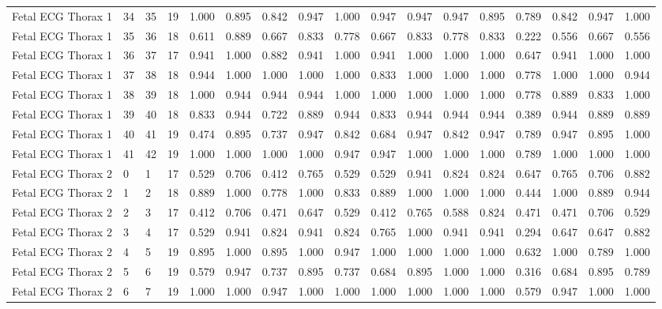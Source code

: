 \begin{longtable}{lllllllllllllllll}
Fetal ECG Thorax 1 & 34 & 35 & 19 & 1.000 & 0.895 & 0.842 & 0.947 & 1.000 & 0.947 & 0.947 & 0.947 & 0.895 & 0.789 & 0.842 & 0.947 & 1.000 \\
Fetal ECG Thorax 1 & 35 & 36 & 18 & 0.611 & 0.889 & 0.667 & 0.833 & 0.778 & 0.667 & 0.833 & 0.778 & 0.833 & 0.222 & 0.556 & 0.667 & 0.556 \\
Fetal ECG Thorax 1 & 36 & 37 & 17 & 0.941 & 1.000 & 0.882 & 0.941 & 1.000 & 0.941 & 1.000 & 1.000 & 1.000 & 0.647 & 0.941 & 1.000 & 1.000 \\
Fetal ECG Thorax 1 & 37 & 38 & 18 & 0.944 & 1.000 & 1.000 & 1.000 & 1.000 & 0.833 & 1.000 & 1.000 & 1.000 & 0.778 & 1.000 & 1.000 & 0.944 \\
Fetal ECG Thorax 1 & 38 & 39 & 18 & 1.000 & 0.944 & 0.944 & 0.944 & 1.000 & 1.000 & 1.000 & 1.000 & 1.000 & 0.778 & 0.889 & 0.833 & 1.000 \\
Fetal ECG Thorax 1 & 39 & 40 & 18 & 0.833 & 0.944 & 0.722 & 0.889 & 0.944 & 0.833 & 0.944 & 0.944 & 0.944 & 0.389 & 0.944 & 0.889 & 0.889 \\
Fetal ECG Thorax 1 & 40 & 41 & 19 & 0.474 & 0.895 & 0.737 & 0.947 & 0.842 & 0.684 & 0.947 & 0.842 & 0.947 & 0.789 & 0.947 & 0.895 & 1.000 \\
Fetal ECG Thorax 1 & 41 & 42 & 19 & 1.000 & 1.000 & 1.000 & 1.000 & 0.947 & 0.947 & 1.000 & 1.000 & 1.000 & 0.789 & 1.000 & 1.000 & 1.000 \\
Fetal ECG Thorax 2 & 0 & 1 & 17 & 0.529 & 0.706 & 0.412 & 0.765 & 0.529 & 0.529 & 0.941 & 0.824 & 0.824 & 0.647 & 0.765 & 0.706 & 0.882 \\
Fetal ECG Thorax 2 & 1 & 2 & 18 & 0.889 & 1.000 & 0.778 & 1.000 & 0.833 & 0.889 & 1.000 & 1.000 & 1.000 & 0.444 & 1.000 & 0.889 & 0.944 \\
Fetal ECG Thorax 2 & 2 & 3 & 17 & 0.412 & 0.706 & 0.471 & 0.647 & 0.529 & 0.412 & 0.765 & 0.588 & 0.824 & 0.471 & 0.471 & 0.706 & 0.529 \\
Fetal ECG Thorax 2 & 3 & 4 & 17 & 0.529 & 0.941 & 0.824 & 0.941 & 0.824 & 0.765 & 1.000 & 0.941 & 0.941 & 0.294 & 0.647 & 0.647 & 0.882 \\
Fetal ECG Thorax 2 & 4 & 5 & 19 & 0.895 & 1.000 & 0.895 & 1.000 & 0.947 & 1.000 & 1.000 & 1.000 & 1.000 & 0.632 & 1.000 & 0.789 & 1.000 \\
Fetal ECG Thorax 2 & 5 & 6 & 19 & 0.579 & 0.947 & 0.737 & 0.895 & 0.737 & 0.684 & 0.895 & 1.000 & 1.000 & 0.316 & 0.684 & 0.895 & 0.789 \\
Fetal ECG Thorax 2 & 6 & 7 & 19 & 1.000 & 1.000 & 0.947 & 1.000 & 1.000 & 1.000 & 1.000 & 1.000 & 1.000 & 0.579 & 0.947 & 1.000 & 1.000 \\

\end{longtable}
